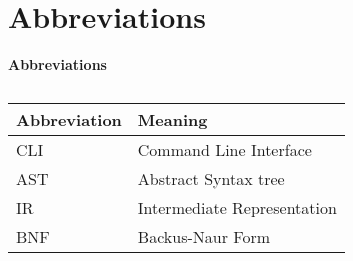 \section{Abbreviations}

\textbf{Abbreviations}\\
\begin{table}[H]
  \caption{}
  \label{tab:}
  \begin{tabular}{|p{5cm}|p{5cm}|}
    \hline
    Abbreviation & Meaning\\
    \hline
    CLI & Command Line Interface\\
    \hline
    AST & Abstract Syntax tree\\
    \hline
    IR & Intermediate Representation\\
    \hline
    BNF & Backus-Naur Form \\
    \hline
  \end{tabular}
\end{table}
